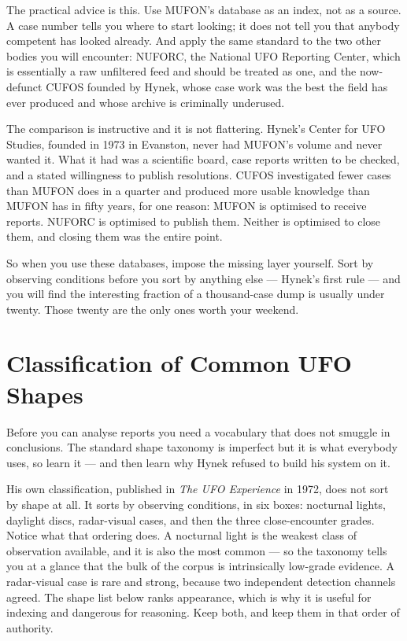 The practical advice is this. Use MUFON's database as an index, not as a source. A case
number tells you where to start looking; it does not tell you that anybody competent has
looked already. And apply the same standard to the two other bodies you will encounter:
NUFORC, the National UFO Reporting Center, which is essentially a raw unfiltered feed and
should be treated as one, and the now-defunct CUFOS founded by Hynek, whose case work was
the best the field has ever produced and whose archive is criminally underused.

The comparison is instructive and it is not flattering. Hynek's Center for UFO Studies, founded
in 1973 in Evanston, never had MUFON's volume and never wanted it. What it had was a scientific
board, case reports written to be checked, and a stated willingness to publish resolutions.
CUFOS investigated fewer cases than MUFON does in a quarter and produced more usable knowledge
than MUFON has in fifty years, for one reason:  MUFON is optimised to receive reports. NUFORC is
optimised to publish them. Neither is optimised to close them, and closing them was the entire
point.

So when you use these databases, impose the missing layer yourself. Sort by observing conditions
before you sort by anything else --- Hynek's first rule --- and you will find the interesting
fraction of a thousand-case dump is usually under twenty. Those twenty are the only ones worth
your weekend.

\section{Classification of Common UFO Shapes}\label{sec:classificationcommonufos}

Before you can analyse reports you need a vocabulary that does not smuggle in conclusions.
The standard shape taxonomy is imperfect but it is what everybody uses, so learn it --- and then
learn why Hynek refused to build his system on it.

His own classification, published in \emph{The UFO Experience} in 1972, does not sort by shape at
all. It sorts by observing conditions, in six boxes: nocturnal lights, daylight discs,
radar-visual cases, and then the three close-encounter grades. Notice what that ordering does. A
nocturnal light is the weakest class of observation available, and it is also the most common ---
so the taxonomy tells you at a glance that the bulk of the corpus is intrinsically low-grade
evidence. A radar-visual case is rare and strong, because two independent detection channels
agreed.  The shape
list below ranks appearance, which is why it is useful for indexing and dangerous for reasoning.
Keep both, and keep them in that order of authority.


